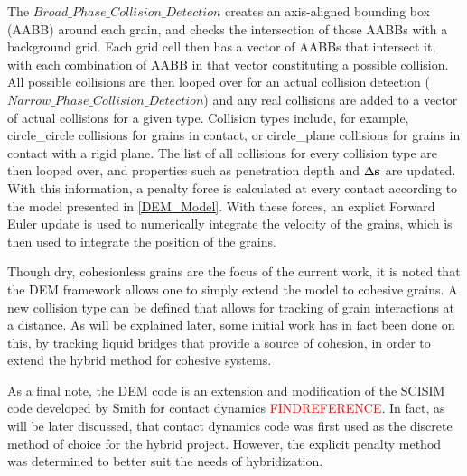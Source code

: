 The $Broad\_Phase\_Collision\_Detection$ creates an axis-aligned bounding box (AABB) around each grain, and checks the intersection of those AABBs with a background grid. Each grid cell then has a vector of AABBs that intersect it, with each combination of AABB in that vector constituting a possible collision. All possible collisions are then looped over for an actual collision detection ($Narrow\_Phase\_Collision\_Detection$) and any real collisions are added to a vector of actual collisions for a given type. Collision types include, for example, circle\_circle collisions for grains in contact, or circle\_plane collisions for grains in contact with a rigid plane. The list of all collisions for every collision type are then looped over, and properties such as penetration depth and $\Delta\bold{s}$ are updated. With this information, a penalty force is calculated at every contact according to the model presented in \ref{DEM_Model}. With these forces, an explict Forward Euler update is used to numerically integrate the velocity of the grains, which is then used to integrate the position of the grains.

Though dry, cohesionless grains are the focus of the current work, it is noted that the DEM framework allows one to simply extend the model to cohesive grains. A new collision type can be defined that allows for tracking of grain interactions at a distance. As will be explained later, some initial work has in fact been done on this, by tracking liquid bridges that provide a source of cohesion, in order to extend the hybrid method for cohesive systems.

As a final note, the DEM code is an extension and modification of the SCISIM code developed by Smith for contact dynamics \textcolor{red}{FINDREFERENCE}. In fact, as will be later discussed, that contact dynamics code was first used as the discrete method of choice for the hybrid project. However, the explicit penalty method was determined to better suit the needs of hybridization.